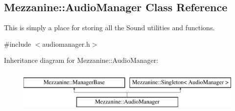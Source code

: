 \hypertarget{classMezzanine_1_1AudioManager}{
\subsection{Mezzanine::AudioManager Class Reference}
\label{classMezzanine_1_1AudioManager}
}


This is simply a place for storing all the Sound utilities and functions.  




{\ttfamily \#include $<$audiomanager.h$>$}

Inheritance diagram for Mezzanine::AudioManager:\begin{figure}[H]
\begin{center}
\leavevmode
\includegraphics[height=2.000000cm]{classMezzanine_1_1AudioManager}
\end{center}
\end{figure}
